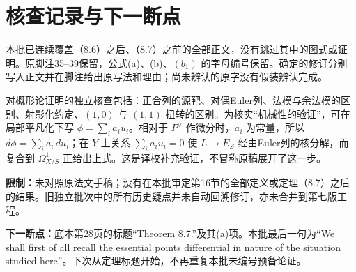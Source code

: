 \documentclass{ctexbook}
\begin{document}
\backmatter
\chapter*{核查记录与下一断点}
本批已连续覆盖（8.6）之后、（8.7）之前的全部正文，没有跳过其中的图式或证明。原脚注35--39保留，公式(a)、(b)、$(b_1)$ 的字母编号保留。确定的修订分别写入正文并在脚注给出原写法和理由；尚未辨认的原字没有假装辨认完成。

对概形论证明的独立核查包括：正合列的源靶、对偶Euler列、法模与余法模的区别、射影化约定、$(1,0)$ 与 $(1,1)$ 扭转的区别。为核实“机械性的验证”，可在局部平凡化下写 $\phi=\sum_i a_i u_i$。相对于 $P^\vee$ 作微分时，$a_i$ 为常量，所以 $d\phi=\sum_i a_i\,du_i$；在 $Y$ 上关系 $\sum_i a_i u_i=0$ 使 $L\to E_Z$ 经由Euler列的核分解，而复合到 $\Omega^1_{X/S}$ 正给出上式。这是译校补充验证，不冒称原稿展开了这一步。

\textbf{限制：}未对照原法文手稿；没有在本批审定第16节的全部定义或定理（8.7）之后的结果。旧独立批次中的所有历史疑点并未自动回溯修订，亦未合并到第七版工程。

\textbf{下一断点：}底本第28页的标题“Theorem 8.7.”及其(a)项。本批最后一句为“We shall first of all recall the essential points differential in nature of the situation studied here”。下次从定理标题开始，不再重复本批未编号预备论证。
\end{document}
